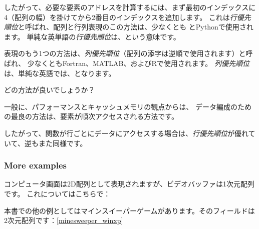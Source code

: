 
したがって、必要な要素のアドレスを計算するには、まず最初のインデックスに
4（配列の幅）を掛けてから2番目のインデックスを追加します。
これは\emph{行優先順位}と呼ばれ、配列と行列表現のこの方法は、少なくとも \CCpp とPythonで使用されます。
単純な英単語の\emph{行優先順位}は、という意味です。

表現のもう1つの方法は、\emph{列優先順位}（配列の添字は逆順で使用されます）と呼ばれ、
少なくともFortran、MATLAB、およびRで使用されます。
\emph{列優先順位}は、単純な英語では、となります。

どの方法が良いでしょうか？

一般に、パフォーマンスとキャッシュメモリの観点からは、
データ編成のための最良の方法は、要素が順次アクセスされる方法です。

したがって、関数が行ごとにデータにアクセスする場合は、\emph{行優先順位}が優れていて、逆もまた同様です。





\subsubsection{More examples}

コンピュータ画面は2D配列として表現されますが、ビデオバッファは1次元配列です。
これについてはこちらで：

本書での他の例としてはマインスイーパーゲームがあります。そのフィールドは2次元配列です：\ref{minesweeper_winxp}

